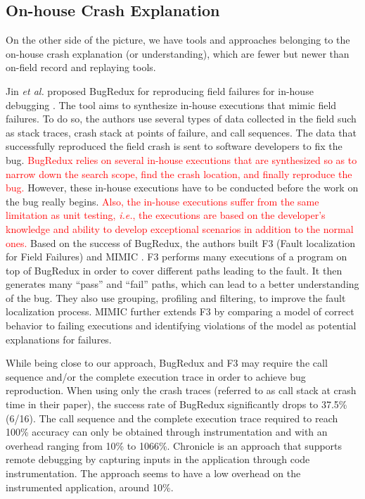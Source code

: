 \documentclass[times, doublespace]{smrauth}
\newcommand{\red}[1]{\textcolor{red}{#1}}
\begin{document}
\subsection{On-house Crash Explanation}

On the other side of the picture, we have tools and approaches belonging to the on-house crash explanation  (or understanding), which are fewer but newer than on-field record and replaying tools.

Jin {\it et al.} proposed BugRedux for reproducing field failures for in-house debugging \cite{Jin2012}.
The tool aims to synthesize in-house executions that mimic field failures.
To do so, the authors use several types of data collected in the field such as stack traces, crash stack at points of failure, and call sequences.
The data that successfully reproduced the field crash is sent to software developers to fix the bug.
\red{BugRedux relies on several in-house executions that are synthesized so as to narrow down the search scope,  find the crash location, and finally reproduce the bug.}
However, these in-house executions have to be conducted before the work on the bug really begins.
\red{Also, the in-house executions suffer from the same limitation as unit testing, {\it i.e.}, the executions are based on the developer's knowledge and ability to develop exceptional scenarios in addition to the normal ones.}
Based on the success of BugRedux, the authors built F3 (Fault
localization for Field Failures) \cite{Jin2013} and MIMIC \cite{Zuddas2014}. F3 performs many
executions of a program on top of BugRedux in order to cover
different paths leading to the fault.
 It then generates many
``pass'' and ``fail'' paths, which can lead to a better understanding
of the bug. They also use grouping, profiling and filtering, to
improve the fault localization process. MIMIC further extends F3 by comparing a model of correct behavior to failing executions and identifying violations of the model as potential explanations for
failures.

While being close to our approach, BugRedux and F3 may require the call sequence and/or the complete execution trace in order to achieve bug reproduction. When using only the crash traces (referred to as call stack at crash time in their paper), the success rate of BugRedux significantly drops to 37.5\% (6/16). The call sequence and the complete execution trace required to reach 100\% accuracy can only be obtained through instrumentation and with an overhead ranging from 10\% to 1066\%. Chronicle \cite{Bell2013} is an approach that supports remote debugging by capturing inputs in the application through code instrumentation.
The approach seems to have a low overhead on the instrumented application, around 10\%.
\end{document}
